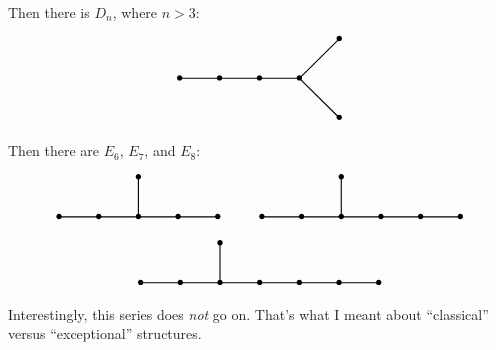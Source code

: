 \documentclass{article}
\begin{document}
Then there is \(D_n\), where \(n > 3\): \[
  \begin{tikzpicture}
    \draw[thick] (0,0) node{$\bullet$} to (1,0) node{$\bullet$} to (2,0) node{$\bullet$} to (3,0) node {$\bullet$};
    \draw[thick] (3,0) to (4,1) node {$\bullet$};
    \draw[thick] (3,0) to (4,-1) node {$\bullet$};
  \end{tikzpicture}
\] Then there are \(E_6\), \(E_7\), and \(E_8\): \[
  \begin{gathered}
    \begin{tikzpicture}
      \draw[thick] (0,0) node{$\bullet$} to (1,0) node{$\bullet$} to (2,0) node{$\bullet$} to (3,0) node {$\bullet$} to (4,0) node {$\bullet$};
      \draw[thick] (2,0) to (2,1) node{$\bullet$};
    \end{tikzpicture}
    \qquad
    \begin{tikzpicture}
      \draw[thick] (0,0) node{$\bullet$} to (1,0) node{$\bullet$} to (2,0) node{$\bullet$} to (3,0) node {$\bullet$} to (4,0) node {$\bullet$} to (5,0) node {$\bullet$};
      \draw[thick] (2,0) to (2,1) node{$\bullet$};
    \end{tikzpicture}
  \\\begin{tikzpicture}
      \draw[thick] (0,0) node{$\bullet$} to (1,0) node{$\bullet$} to (2,0) node{$\bullet$} to (3,0) node {$\bullet$} to (4,0) node {$\bullet$} to (5,0) node {$\bullet$} to (6,0) node {$\bullet$};
      \draw[thick] (2,0) to (2,1) node{$\bullet$};
    \end{tikzpicture}
  \end{gathered}
\] Interestingly, this series does \emph{not} go on. That's what I meant
about ``classical'' versus ``exceptional'' structures.
\end{document}
